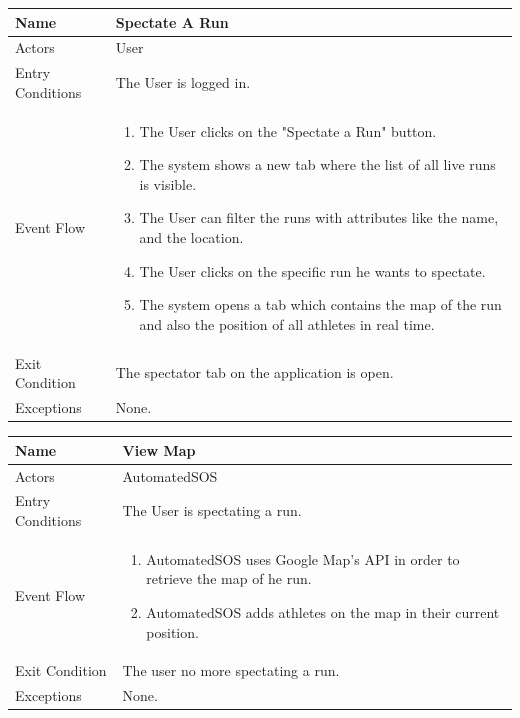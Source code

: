\begin{enumerate}
\FloatBarrier
\begin{table}[h]
\begin{tabular}{|l|p{}|}
\hline
Name             & Spectate A Run \\ \hline
Actors           & User  \\ \hline
Entry Conditions & The User is logged in.    \\ \hline
Event Flow       & \begin{enumerate}
            \item The User clicks on the "Spectate a Run" button.
            \item The system shows a new tab where the list of all live runs is visible.
            \item The User can filter the runs with attributes like the name, and the location.
            \item The User clicks on the specific run he wants to spectate.
            \item The system opens a tab which contains the map of the run and also the position of all athletes in real time.
        \end{enumerate}\\ \hline
Exit Condition   & The spectator tab on the application is open.\\ \hline
Exceptions       & None.\\ \hline
\end{tabular}
\end{table}
\FloatBarrier

\FloatBarrier
\begin{table}[h]
\begin{tabular}{|l|p{}|}
\hline
Name             & View Map \\ \hline
Actors           & AutomatedSOS  \\ \hline
Entry Conditions & The User is spectating a run.    \\ \hline
Event Flow       & \begin{enumerate}
            \item AutomatedSOS uses Google Map's API in order to retrieve the map of he run.
            \item AutomatedSOS adds athletes on the map in their current position.
        \end{enumerate}\\ \hline
Exit Condition   & The user no more spectating a run.\\ \hline
Exceptions       & None.\\ \hline
\end{tabular}
\end{table}
\FloatBarrier

\end{enumerate}


